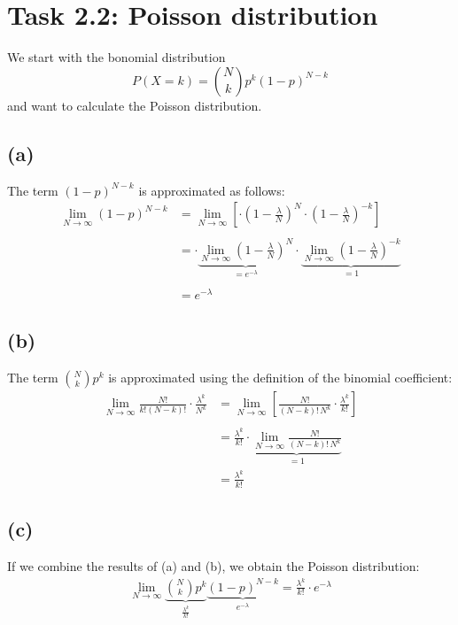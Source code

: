 \documentclass{article}
\begin{document}
\section*{Task 2.2: Poisson distribution}
We start with the bonomial distribution
\[
P(X = k) = \binom{N}{k} p^k (1 - p)^{N-k}
\]
and want to calculate the Poisson distribution.
\subsection*{(a)}
The term $(1 - p)^{N-k}$ is approximated as follows:
\begin{align}
\lim_{N \to \infty} (1 - p)^{N-k} &= \lim_{N \to \infty}
\left[
\cdot \left(1 - \frac{\lambda}{N}\right)^N
\cdot \left(1 - \frac{\lambda}{N}\right)^{-k}
\right] \\
\\
&=
\cdot \underbrace{\lim_{N \to \infty} \left(1 - \frac{\lambda}{N}\right)^N}_{=e^{-\lambda}}
\cdot \underbrace{\lim_{N \to \infty} \left(1 - \frac{\lambda}{N}\right)^{-k}}_{=1} \\
\\
&= e^{-\lambda}
\end{align}

\subsection*{(b)}
The term $\binom{N}{k} p^k$ is approximated using the definition of the binomial coefficient:
\begin{align}
\lim_{N \to \infty} \frac{N!}{k!(N-k)!}
\cdot \frac{\lambda^k}{N^k}
&= \lim_{N \to \infty}
\left[
\frac{N!}{(N-k)! \, N^k}
\cdot \frac{\lambda^k}{k!}
\right] \\
\\
&= \frac{\lambda^k}{k!}
\cdot \underbrace{\lim_{N \to \infty} \frac{N!}{(N-k)! \, N^k}}_{=1}
\\
&= \frac{\lambda^k}{k!}
\end{align}

\subsection*{(c)}
If we combine the results of (a) and (b), we obtain the Poisson distribution:
\begin{align}
  \lim_{N \to \infty} \underbrace{\binom{N}{k} p^k}_{\frac{\lambda^k}{k!}} \underbrace{(1 - p)^{N-k}}_{e^{-\lambda}} = \frac{\lambda^k}{k!} \cdot  e^{-\lambda}
\end{align}
\end{document}
